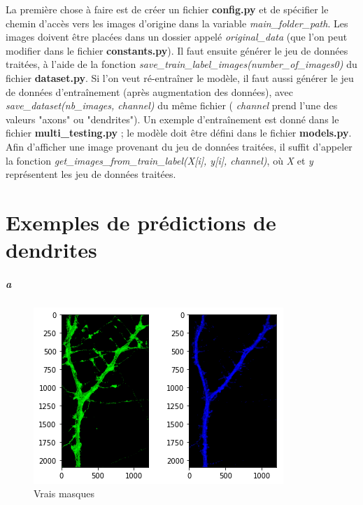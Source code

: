 \documentclass{report}
\begin{document}
La première chose à faire est de créer un fichier \textbf{config.py} et de spécifier
le chemin d'accès vers les images d'origine dans la variable \textit{main\_folder\_path}.
Les images doivent être placées dans un dossier appelé \textit{original\_data} (que
l'on peut modifier dans le fichier \textbf{constants.py}). Il faut ensuite générer
le jeu de données traitées, à l'aide de la fonction \textit{save\_train\_label\_images(number\_of\_images0)}
du fichier \textbf{dataset.py}. Si l'on veut ré-entraîner le modèle, il faut aussi
générer le jeu de données d'entraînement (après augmentation des données), avec
 \textit{save\_dataset(nb\_images, channel)} du même fichier ( \textit{channel} prend l'une
 des valeurs "axons" ou "dendrites"). Un exemple d'entraînement est donné dans le fichier
 \textbf{multi\_testing.py} ; le modèle doit être défini dans le fichier \textbf{models.py}.
 Afin d'afficher une image provenant du jeu de données traitées, il suffit d'appeler
 la fonction \textit{get\_images\_from\_train\_label(X[i], y[i], channel)}, où \textit{X}
 et \textit{y} représentent les jeu de données traitées.

 \appendix

 \chapter{Exemples de prédictions de dendrites}

 \paragraph{a}

 \begin{figure}[H]
 \centering
 \includegraphics[scale=0.35]{"2_truth"}
 \caption{Vrais masques}
 \end{figure}
\end{document}
